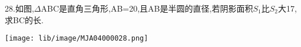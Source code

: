 28.如图,$\Delta$ABC是直角三角形,AB=20,且AB是半圆的直径,若阴影面积$S_1$比$S_2$大17,求BC的长.

\begin{flushright}

    \texttt{[image: lib/image/MJA04000028.png]}

\end{flushright}



